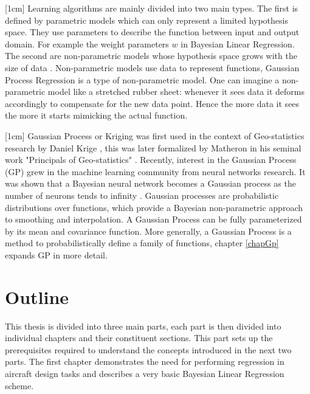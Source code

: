 [1cm]
Learning algorithms are mainly divided into two main types. The first is defined by parametric models which can only represent a limited hypothesis space. They use parameters to describe the function between input and output domain. For example the weight parameters \(w\) in Bayesian Linear Regression. The second are non-parametric models whose hypothesis space grows with the size of data \cite{ghahramani2013bayesian}. Non-parametric models use data to represent functions, Gaussian Process Regression is a type of non-parametric model. One can imagine a non-parametric model like a stretched rubber sheet: whenever it sees data it deforms accordingly to compensate for the new data point. Hence the more data it sees the more it starts mimicking the actual function. 

[1cm]
Gaussian Process or Kriging was first used in the context of Geo-statistics research by Daniel Krige \cite{krige1951statistical}, this was later formalized by Matheron in his seminal work "Principals of Geo-statistics" \cite{matheron1963principles}. Recently, interest in the Gaussian Process (GP) grew in the machine learning community from neural networks research. It was shown that a Bayesian neural network becomes a Gaussian process as the number of neurons tends to infinity \cite{neal2012bayesian}. Gaussian processes are probabilistic distributions over functions, which provide a Bayesian non-parametric approach to smoothing and interpolation. A Gaussian Process can be fully parameterized by its mean and covariance function. More generally, a Gaussian Process is a method to probabilistically define a family of functions, chapter \ref{chapGp} expands GP in more detail. 

\section{Outline}\label{secOutline}
This thesis is divided into three main parts, each part is then divided into individual chapters and their constituent sections. This part sets up the prerequisites required to understand the concepts introduced in the next two parts. The first chapter demonstrates the need for performing regression in aircraft design tasks and describes a very basic Bayesian Linear Regression scheme. 

